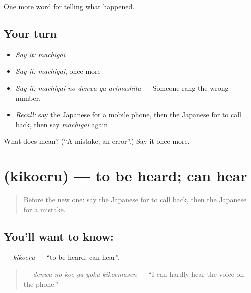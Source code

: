 \begin{grammarlens}[title={What you've built}]
One more word for telling what happened.
\end{grammarlens}

\subsection*{Your turn}
\begin{itemize}
\raggedright
  \item \emph{Say it:} \emph{machigai}
  \item \emph{Say it:} \emph{machigai}, once more
  \item \emph{Say it:} \emph{machigai no denwa ga arimashita} — Someone rang the wrong number.
  \item \emph{Recall:} say the Japanese for a mobile phone, then the Japanese for to call back, then say \emph{machigai} again
\end{itemize}

\begin{tcolorbox}[breakable,colback=teal!4,colframe=teal!35!black,title={Before you move on}]
What does  mean? (\textquotedblleft{}A mistake; an error\textquotedblright{}.) Say it once more.
\end{tcolorbox}
\section[\texorpdfstring{\ja{きこえる} (kikoeru)}{きこえる (kikoeru)}]{ (kikoeru) — to be heard; can hear}

\label{lesson:JA-C308-kikoeru}



\begin{quote}
Before the new one: say the Japanese for to call back, then the Japanese for a mistake.
\end{quote}

\subsection*{You'll want to know: }
\textbf{} — \emph{kikoeru} — \textquotedblleft{}to be heard; can hear\textquotedblright{}.

\begin{quote}
\textbf{   } — \emph{denwa no koe ga yoku kikoemasen} — \textquotedblleft{}I can hardly hear the voice on the phone.\textquotedblright{}
\end{quote}

